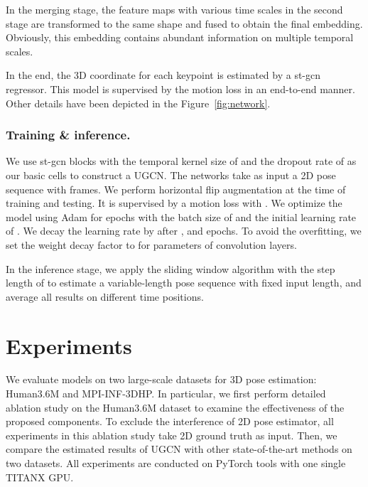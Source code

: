\documentclass[runningheads]{llncs}
\begin{document}
In the merging stage, the feature maps with various time scales in the second stage are transformed to the same shape and fused to obtain the final embedding.
Obviously, this embedding contains abundant information on multiple temporal scales.

In the end,
the 3D coordinate for each keypoint is estimated by a st-gcn regressor.
This model is supervised by the motion loss in an end-to-end manner.
Other details have been depicted in the Figure~\ref{fig:network}.

\subsubsection{Training \& inference.}
We use st-gcn blocks with the temporal kernel size of  and the dropout rate of  as our basic cells to construct a UGCN.
The networks take as input a 2D pose sequence with  frames.
We perform horizontal flip augmentation at the time of training and testing.
It is supervised by a motion loss with .
We optimize the model using Adam for  epochs with the batch size of  and the initial learning rate of . We decay the learning rate by  after ,  and  epochs.
To avoid the overfitting, we set the weight decay factor to  for parameters of convolution layers.

In the inference stage,
we apply the sliding window algorithm with the step length of  to estimate a variable-length
pose sequence with fixed input length,
and average all results on different time positions.
\section{Experiments}

We evaluate models on two large-scale datasets for 3D pose estimation: Human3.6M and MPI-INF-3DHP.
In particular, we first perform detailed ablation study on the Human3.6M dataset
to examine the effectiveness of the proposed components.
To exclude the interference of 2D pose estimator, all experiments in this ablation study take 2D ground truth as input.
Then, we compare the estimated results of UGCN with other state-of-the-art methods on two datasets.
All experiments are conducted on PyTorch tools with one single TITANX GPU.
\end{document}
